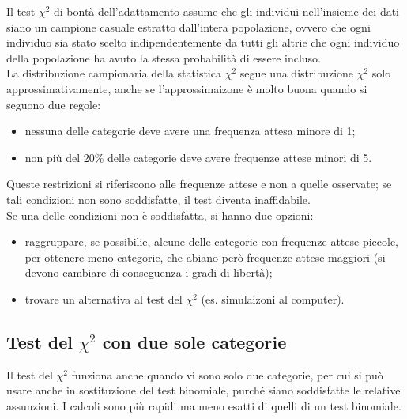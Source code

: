 \documentclass[10pt, draft]{book}
\begin{document}
Il test $\chi^2$ di bontà dell'adattamento assume che gli individui nell'insieme dei dati siano un campione casuale estratto dall'intera popolazione, ovvero che ogni individuo sia stato scelto indipendentemente da tutti gli altrie che ogni individuo della popolazione ha avuto la stessa probabilità di essere incluso.
\\
La distribuzione campionaria della statistica $\chi^2$ segue una distribuzione $\chi^2$ solo approssimativamente, anche se l'approssimaizone è molto buona quando si seguono due regole:
\begin{itemize}
    \item nessuna delle categorie deve avere una frequenza attesa minore di 1;
    \item non più del 20\% delle categorie deve avere frequenze attese minori di 5.
\end{itemize}
Queste restrizioni si riferiscono alle frequenze attese e non a quelle osservate; se tali condizioni non sono soddisfatte, il test diventa inaffidabile.
\\
Se una delle condizioni non è soddisfatta, si hanno due opzioni:
\begin{itemize}
    \item raggruppare, se possibilie, alcune delle categorie con frequenze attese piccole, per ottenere meno categorie, che abiano però frequenze attese maggiori (si devono cambiare di conseguenza i gradi di libertà);
    \item trovare un alternativa al test del $\chi^2$ (es. simulaizoni al computer).
\end{itemize}

\subsection{Test del \texorpdfstring{$\chi^2$}{Lg} con due sole categorie}

Il test del $\chi^2$ funziona anche quando vi sono solo due categorie, per cui si può usare anche in sostituzione del test binomiale, purché siano soddisfatte le relative assunzioni. I calcoli sono più rapidi ma meno esatti di quelli di un test binomiale.
\end{document}
